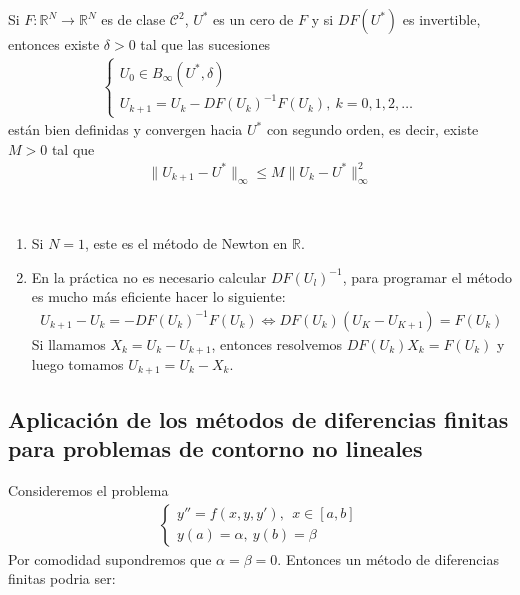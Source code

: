 \begin{teo}
    Si $F : \mathbb{R}^N \longrightarrow \mathbb{R}^N$ es de clase $\mathcal{C}^2$, $U^*$ es un cero de $F$ y si $DF(U^*)$ es invertible, entonces existe $\delta > 0$ tal que las sucesiones
    \begin{align*}
        \left\{ \begin{array}{lcc}
                    U_0 \in B_{\infty}(U^*,\delta) \\
                    U_{k+1} = U_k- DF(U_k)^{-1} F(U_k), \ k = 0,1,2,\ldots
                \end{array}
        \right.
    \end{align*}
    están bien definidas y convergen hacia $U^*$ con segundo orden, es decir, existe $M > 0$ tal que
    \begin{align*}
        \|U_{k+1} - U^*\|_{\infty} \leq M \| U_k - U^*\|_{\infty}^2
    \end{align*}
\end{teo}

\begin{obs} \
    \begin{enumerate}
        \item Si $N = 1$, este es el método de Newton en $\mathbb{R}$.
        \item En la práctica no es necesario calcular $DF(U_l)^{-1}$, para programar el método es mucho más eficiente hacer lo siguiente:
              \begin{align*}
                  U_{k+1} -U_k = -DF(U_k)^{-1}F(U_k) \Longleftrightarrow DF(U_k)(U_K - U_{K+1}) = F(U_k)
              \end{align*}
              Si llamamos $X_k = U_k - U_{k+1}$, entonces resolvemos $DF(U_k)X_k = F(U_k)$ y luego tomamos $U_{k+1} = U_k - X_k$.
    \end{enumerate}
\end{obs}

\subsection{Aplicación de los métodos de diferencias finitas para problemas de contorno no lineales}

Consideremos el problema
\begin{align*}
    \left\{ \begin{array}{lcc}
                y'' = f(x,y,y'), \ \ x \in [a,b] \\
                y(a) = \alpha, \ y(b) = \beta
            \end{array}
    \right.
\end{align*}
Por comodidad supondremos que $\alpha = \beta = 0$. Entonces un método de diferencias finitas podria ser:

